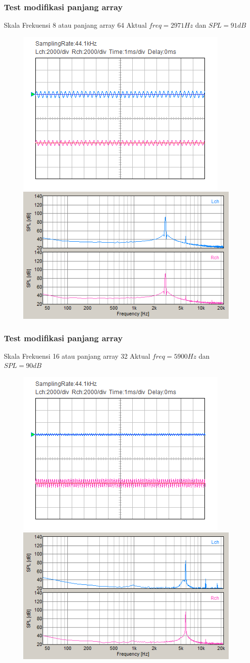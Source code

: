 \documentclass[table,dvipsnames,10pt]{beamer}
\begin{document}
	\begin{frame}[fragile]
	\frametitle{Test modifikasi panjang array}
	\begin{exampleblock}{Skala Frekuensi 8 atau panjang array 64}
		Aktual $freq = 2971 Hz$ dan $SPL = 91 dB$
		\begin{figure}[H]
			\centering
			\includegraphics[width=0.4\linewidth]{result/day_4/osi_sine8}
			\includegraphics[width=0.45\linewidth]{result/day_4/fft_sine8}
		\end{figure}
	\end{exampleblock}
	\end{frame}

	\begin{frame}[fragile]
	\frametitle{Test modifikasi panjang array}
	\begin{exampleblock}{Skala Frekuensi 16 atau panjang array 32}
		Aktual $freq = 5900 Hz$ dan $SPL = 90 dB$
		\begin{figure}[H]
			\centering
			\includegraphics[width=0.4\linewidth]{result/day_4/osi_sine16}
			\includegraphics[width=0.45\linewidth]{result/day_4/fft_sine16}
		\end{figure}
	\end{exampleblock}
	\end{frame}
\end{document}
